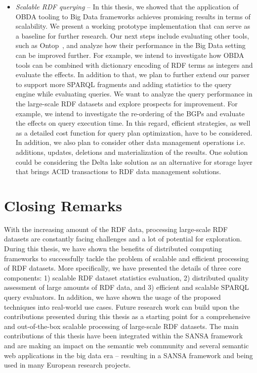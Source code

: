 \begin{itemize}
    \item \textit{Scalable \gls{RDF} querying} -- 
    In this thesis, we showed that the application of OBDA tooling to Big Data frameworks achieves promising results in terms of scalability. 
    We present a working prototype implementation that can serve as a baseline for further research. 
    Our next steps include evaluating other tools, such as Ontop~\cite{Calvanese2017OntopAS}, and analyze how their performance in the Big Data setting can be improved further. 
    For example, we intend to investigate how OBDA tools can be combined with dictionary encoding of \gls{RDF} terms as integers and evaluate the effects.
    In addition to that, we plan to further extend our parser to support more \gls{SPARQL} fragments and adding statistics to the query engine while evaluating queries. 
    We want to analyze the query performance in the large-scale \gls{RDF} datasets and explore prospects for improvement.
    For example, we intend to investigate the re-ordering of the \gls{BGP}s and evaluate the effects on query execution time.
    In this regard, efficient strategies, as well as a detailed cost function for query plan optimization, have to be considered.
    In addition, we also plan to consider other data management operations i.e. additions, updates, deletions and materialization of the results.
    One solution could be considering the Delta lake solution as an alternative for storage layer that brings ACID transactions to \gls{RDF} data management solutions.
\end{itemize}

\section{Closing Remarks}
With the increasing amount of the \gls{RDF} data, processing large-scale \gls{RDF} datasets are constantly facing challenges and a lot of potential for exploration.
During this thesis, we have shown the benefits of distributed computing frameworks to successfully tackle the problem of scalable and efficient processing of \gls{RDF} datasets.
More specifically, we have presented the details of three core components: 1) scalable \gls{RDF} dataset statistics evaluation, 2) distributed quality assessment of large amounts of \gls{RDF} data, and 3) efficient and scalable \gls{SPARQL} query evaluators.
In addition, we have shown the usage of the proposed techniques into real-world use cases.
Future research work can build upon the contributions presented during this thesis as a starting point for a comprehensive and out-of-the-box scalable processing of large-scale \gls{RDF} datasets.
The main contributions of this thesis have been integrated within the SANSA framework and are making an impact on the semantic web community and several semantic web applications in the big data era -- resulting in a SANSA framework and being used in many European research projects.


